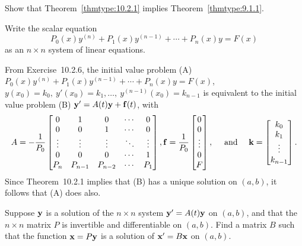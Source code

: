 \documentclass{ximera}
\begin{document}
\begin{problem}\label{exer:10.2.12} Show that Theorem~\ref{thmtype:10.2.1} implies
Theorem~\ref{thmtype:9.1.1}.  
\begin{hint}Write the scalar equation
$$
P_0(x)y^{(n)}+P_1(x)y^{(n-1)}+\cdots+P_n(x)y=F(x)
$$
as an $n\times n$ system of linear equations.
\end{hint}

\begin{solution}
    From Exercise~10.2.6, the initial value problem
(A) $P_0(x)y^{(n)}+P_1(x)y^{(n-1)}+\cdots+P_n(x)y=F(x)$,
$y(x_0)=k_0,\ y'(x_0)=k_1,\dots,\ y^{(n-1)}(x_0)=k_{n-1}$ is
equivalent to the initial value problem (B) ${\bf y'}=A(t){\bf y}+{\bf
f}(t)$, with
$$A=-\frac{1}{ P_0}
\begin{bmatrix}
0&1&0&\cdots&0\\
0&0&1&\cdots&0\\
\vdots&\vdots&\vdots&\ddots&\vdots\\
0&0&0&\cdots&1\\
P_n&P_{n-1}&P_{n-2}&\cdots&P_1
\end{bmatrix},
{\bf f}=\frac{1}{ P_0}
\begin{bmatrix}
0\\ 0\\\vdots\\0\\F
\end{bmatrix},
\quad\text{ and }\quad
{\bf k}=
\begin{bmatrix}
k_0\\k_1\\\vdots\\k_{n-1}
\end{bmatrix}.
$$
Since Theorem~10.2.1 implies that (B) has a unique solution on
$(a,b)$, it follows that (A) does also.
\end{solution}
\end{problem}

\begin{problem}\label{exer:10.2.13}
Suppose ${\bf y}$ is a solution of the $n\times n$ system  ${\bf
y}'=A(t){\bf y}$ on $(a,b)$, and that the $n\times n$ matrix $P$
is invertible and differentiable on $(a,b)$. Find a matrix $B$
such that the function ${\bf x}=P{\bf y}$ is a solution of ${\bf x}'=B{\bf
x}$ on $(a,b)$.
\end{problem}
\end{document}
